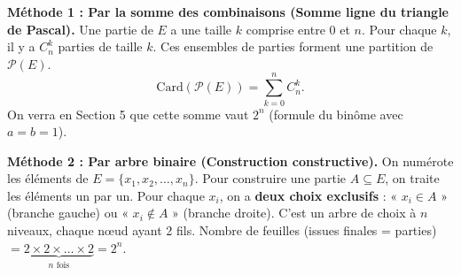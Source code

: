 \documentclass[11pt]{article}
\begin{document}
\begin{experience}
\textbf{Méthode 1 : Par la somme des combinaisons (Somme ligne du triangle de Pascal).}
Une partie de $E$ a une taille $k$ comprise entre $0$ et $n$. Pour chaque $k$, il y a $C_n^k$ parties de taille $k$. Ces ensembles de parties forment une partition de $\mathcal{P}(E)$.
\[\text{Card}(\mathcal{P}(E)) = \sum_{k=0}^n C_n^k.\]
On verra en Section 5 que cette somme vaut $2^n$ (formule du binôme avec $a=b=1$).

\textbf{Méthode 2 : Par arbre binaire (Construction constructive).}
On numérote les éléments de $E = \{x_1, x_2, \dots, x_n\}$.
Pour construire une partie $A \subseteq E$, on traite les éléments un par un. Pour chaque $x_i$, on a \textbf{deux choix exclusifs} : « $x_i \in A$ » (branche gauche) ou « $x_i \notin A$ » (branche droite).
C'est un arbre de choix à $n$ niveaux, chaque nœud ayant 2 fils.
Nombre de feuilles (issues finales = parties) $= \underbrace{2 \times 2 \times \dots \times 2}_{n \text{ fois}} = 2^n$.
\end{experience}
\end{document}
